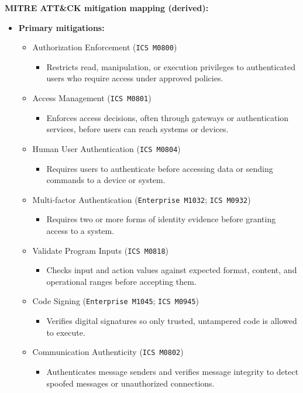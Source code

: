 \documentclass[10pt,a4paper,oneside]{report}
\begin{document}
\textbf{MITRE ATT\&CK mitigation mapping (derived):}

\begin{itemize}
\item \textbf{Primary mitigations:}
\begin{itemize}
\item Authorization Enforcement (\texttt{ICS M0800})
\begin{itemize}
\item Restricts read, manipulation, or execution privileges to authenticated users who require access under approved policies.
\end{itemize}
\item Access Management (\texttt{ICS M0801})
\begin{itemize}
\item Enforces access decisions, often through gateways or authentication services, before users can reach systems or devices.
\end{itemize}
\item Human User Authentication (\texttt{ICS M0804})
\begin{itemize}
\item Requires users to authenticate before accessing data or sending commands to a device or system.
\end{itemize}
\item Multi-factor Authentication (\texttt{Enterprise M1032}; \texttt{ICS M0932})
\begin{itemize}
\item Requires two or more forms of identity evidence before granting access to a system.
\end{itemize}
\item Validate Program Inputs (\texttt{ICS M0818})
\begin{itemize}
\item Checks input and action values against expected format, content, and operational ranges before accepting them.
\end{itemize}
\item Code Signing (\texttt{Enterprise M1045}; \texttt{ICS M0945})
\begin{itemize}
\item Verifies digital signatures so only trusted, untampered code is allowed to execute.
\end{itemize}
\item Communication Authenticity (\texttt{ICS M0802})
\begin{itemize}
\item Authenticates message senders and verifies message integrity to detect spoofed messages or unauthorized connections.

\end{itemize}
\end{itemize}
\end{itemize}
\end{document}
